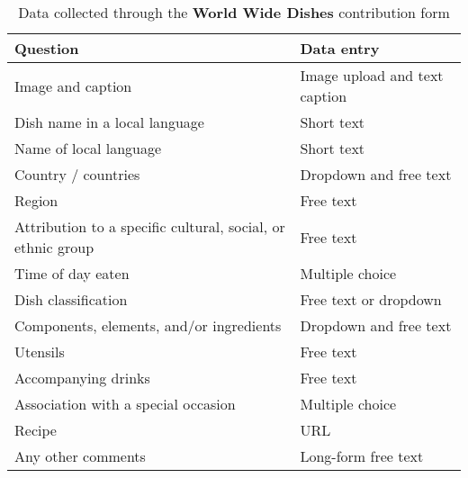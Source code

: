 \begin{table}[h]
\centering
\caption{\small Data collected through the  \textbf{World Wide Dishes} contribution form}
\label{tab:dish_questions}
\begin{tabular}{ll}
\toprule
\textbf{Question} & \textbf{Data entry} \\
\midrule
Image and caption & Image upload and text caption \\
Dish name in a local language & Short text \\
Name of local language & Short text \\
Country / countries & Dropdown and free text \\
Region & Free text \\
Attribution to a specific cultural, social, or ethnic group & Free text \\
Time of day eaten & Multiple choice \\
Dish classification & Free text or dropdown \\
Components, elements, and/or ingredients & Dropdown and free text \\
Utensils & Free text \\
Accompanying drinks & Free text \\
Association with a special occasion & Multiple choice \\
Recipe & URL \\
Any other comments & Long-form free text \\
\bottomrule
\end{tabular}
\end{table}